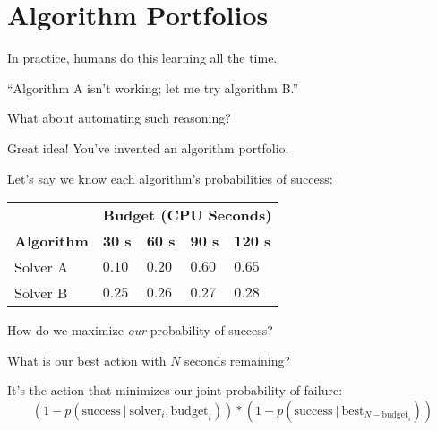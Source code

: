 \section{Algorithm Portfolios}

\begin{frame}
In practice, humans do this learning all the time.
\end{frame}

\begin{frame}
``Algorithm A isn't working; let me try algorithm B.''
\end{frame}

\begin{frame}
What about automating such reasoning?
\end{frame}

\begin{frame}
Great idea! You've invented an algorithm portfolio.
\end{frame}

\begin{frame}
Let's say we know each algorithm's probabilities of success:

\begin{center}
\begin{tabular}{lllll}
\toprule
& \multicolumn{4}{l}{{\bf Budget (CPU Seconds)}}\\
\cmidrule{2-5}
{\bf Algorithm} & {\bf 30 s} & {\bf 60 s} & {\bf 90 s} & {\bf 120 s}\\
\midrule
Solver A & $0.10$ & $0.20$ & $0.60$ & $0.65$\\
Solver B & $0.25$ & $0.26$ & $0.27$ & $0.28$\\
\bottomrule
\end{tabular}
\end{center}

How do we maximize \emph{our} probability of success?
\end{frame}

\begin{frame}

What is our best action with $N$ seconds remaining?

It's the action that minimizes our joint probability of failure:
\[ (1 - p(\textrm{success}\ |\ \textrm{solver}_i, \textrm{budget}_i)) * (1 - p(\textrm{success}\ |\ \textrm{best}_{N - \textrm{budget}_i})) \]


\end{frame}

